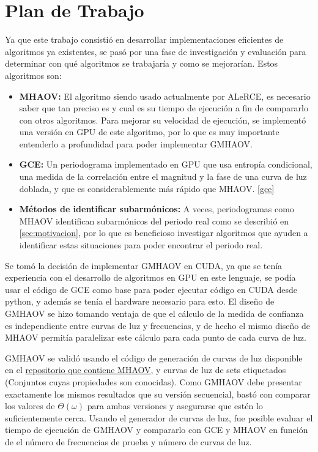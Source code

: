\section{Plan de Trabajo}\label{chap:sol}

Ya que este trabajo consistió en desarrollar implementaciones eficientes de algoritmos ya existentes, se pasó por una fase de investigación y evaluación para determinar con qué algoritmos se trabajaría y como se mejorarían. Estos algoritmos son:
\begin{itemize}
    \item {\bf MHAOV:} El algoritmo siendo usado actualmente por ALeRCE, es necesario saber que tan preciso es y cual es su tiempo de ejecución a fin de compararlo con otros algoritmos. Para mejorar su velocidad de ejecución, se implementó una versión en GPU de este algoritmo, por lo que es muy importante entenderlo a profundidad para poder implementar GMHAOV.
    \item {\bf GCE:} Un periodograma implementado en GPU que usa entropía condicional, una medida de la correlación entre el magnitud y la fase de una curva de luz doblada, y que es considerablemente más rápido que MHAOV. \ref{gce}
    \item {\bf Métodos de identificar subarmónicos:} A veces, periodogramas como MHAOV identifican subarmónicos del periodo real como se describió en \ref{sec:motivacion}, por lo que es beneficioso investigar algoritmos que ayuden a identificar estas situaciones para poder encontrar el periodo real.
\end{itemize}

Se tomó la decisión de implementar GMHAOV en CUDA, ya que se tenía experiencia con el desarrollo de algoritmos en GPU en este lenguaje, se podía usar el código de GCE como base para poder ejecutar código en CUDA desde python, y además se tenía el hardware necesario para esto. El diseño de GMHAOV se hizo tomando ventaja de que el cálculo de la medida de confianza es independiente entre curvas de luz y frecuencias, y de hecho el mismo diseño de MHAOV permitía paralelizar este cálculo para cada punto de cada curva de luz.

GMHAOV se validó usando el código de generación de curvas de luz disponible en el 
\href{https://github.com/alercebroker/P4J}{repositorio que contiene MHAOV}, y curvas de luz de sets etiquetados (Conjuntos cuyas propiedades son conocidas). Como GMHAOV debe presentar exactamente los mismos resultados que su versión secuencial, bastó con comparar los valores de $\Theta(\omega)$ para ambas versiones y asegurarse que estén lo suficientemente cerca. Usando el generador de curvas de luz, fue posible evaluar el tiempo de ejecución de GMHAOV y compararlo con GCE y MHAOV en función de el número de frecuencias de prueba y número de curvas de luz.

